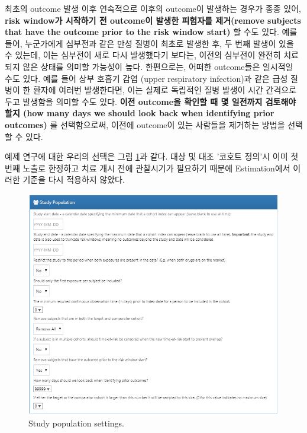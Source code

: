 \documentclass[11pt]{book}
\theoremstyle{definition}
\theoremstyle{definition}
\theoremstyle{definition}
\theoremstyle{remark}
\begin{document}
최초의 outcome 발생 이후 연속적으로 이후의 outcome이 발생하는 경우가
종종 있어, \textbf{risk window가 시작하기 전 outcome이 발생한 피험자를
제거(remove subjects that have the outcome prior to the risk window
start)} 할 수도 있다. 예를 들어, 누군가에게 심부전과 같은 만성 질병이
최초로 발생한 후, 두 번째 발생이 있을 수 있는데, 이는 심부전이 새로 다시
발생했다기 보다는, 이전의 심부전이 완전히 치료되지 않은 상태를 의미할
가능성이 높다. 한편으로는, 어떠한 outcome들은 일시적일 수도 있다. 예를
들어 상부 호흡기 감염 (upper respiratory infection)과 같은 급성 질병이
한 환자에 여러번 발생한다면, 이는 실제로 독립적인 질병 발생이 시간
간격으로 두고 발생함을 의미할 수도 있다. \textbf{이전 outcome을 확인할
때 몇 일전까지 검토해야 할지 (how many days we should look back when
identifying prior outcomes)} 를 선택함으로써, 이전에 outcome이 있는
사람들을 제거하는 방법을 선택할 수 있다.

예제 연구에 대한 우리의 선택은 그림 \ref{fig:studyPopulation}과 같다.
대상 및 대조 '코호트 정의'시 이미 첫 번째 노출로 한정하고 치료 개시 전에
관찰시기가 필요하기 때문에 Estimation에서 이러한 기준을 다시 적용하지
않았다.

\begin{figure}

{\centering \includegraphics[width=1\linewidth]{images/PopulationLevelEstimation/studyPopulation} 

}

\caption{Study population settings.}\label{fig:studyPopulation}
\end{figure}
\end{document}
